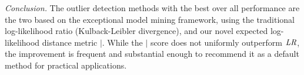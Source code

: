 {\begin{table}
																\end{table}
																
																{\em Conclusion.} The outlier detection methods with the best over all performance are the two based on the exceptional model mining framework, using the traditional log-likelihood ratio (Kulback-Leibler divergence), and our novel expected log-likelihood distance metric $\mid$. While the $\mid$ score does not uniformly outperform $\it{LR}$, the improvement is frequent and substantial enough to recommend it as a default method for practical applications. 

%					


}
